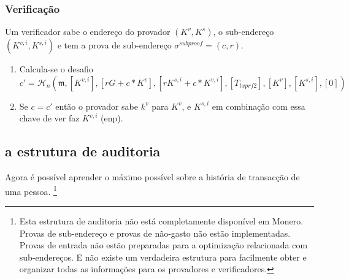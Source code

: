 \subsubsection*{Verificação}

Um verificador sabe o endereço do provador $(K^v, K^s)$, o sub-endereço $(K^{v,i}, K^{s,i})$ e tem a prova de sub-endereço $\sigma^{subproof} = (c,r)$.


\begin{enumerate}
    \item Calcula-se o desafio\vspace{.175cm}
	\[c' = \mathcal{H}_n(\mathfrak{m},[K^{v,i}], [r G + c*K^v], [r K^{s,i} + c*K^{v,i}], [T_{txprf2}], [K^v], [K^{s,i}], [0])\]
    \item Se $c = c'$ então o provador sabe $k^v$ para $K^v$, e $K^{s,i}$ em combinação com essa chave de ver faz $K^{v,i}$ (enp).
\end{enumerate}{}


\subsection{a estrutura de auditoria}
\label{subsec:audit-framework}

Agora é possível aprender o máximo possível sobre a história de transacção de uma pessoa.
\footnote{
Esta estrutura de auditoria não está completamente disponível em Monero. Provas de sub-endereço e provas de não-gasto não estão implementadas. Provas de entrada não estão preparadas para a optimização relacionada com sub-endereços. E não existe um verdadeira estrutura para facilmente obter e organizar todas as informações para os provadores e verificadores.}

